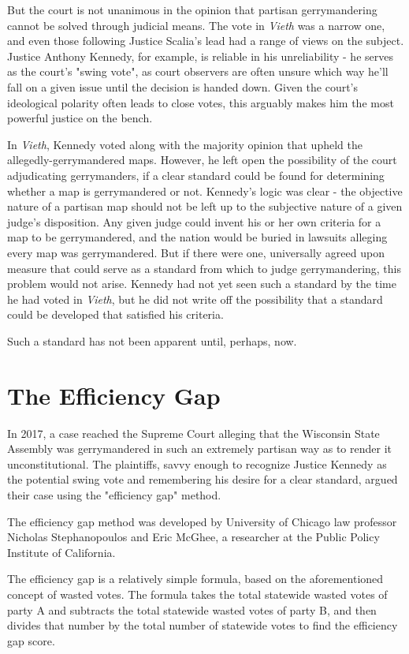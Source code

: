 \documentclass[sigconf]{acmart}
\begin{document}
But the court is not unanimous in the opinion that partisan gerrymandering cannot be solved through judicial means. The vote in \textit{Vieth} was a narrow one, and even those following Justice Scalia's lead had a range of views on the subject. Justice Anthony Kennedy, for example, is reliable in his unreliability - he serves as the court's "swing vote", as court observers are often unsure which way he'll fall on a given issue until the decision is handed down. Given the court's ideological polarity often leads to close votes, this arguably makes him the most powerful justice on the bench. 

In \textit{Vieth}, Kennedy voted along with the majority opinion that upheld the allegedly-gerrymandered maps. However, he left open the possibility of the court adjudicating gerrymanders, if a clear standard could be found for determining whether a map is gerrymandered or not.\cite{wapo} Kennedy's logic was clear - the objective nature of a partisan map should not be left up to the subjective nature of a given judge's disposition. Any given judge could invent his or her own criteria for a map to be gerrymandered, and the nation would be buried in lawsuits alleging every map was gerrymandered. But if there were one, universally agreed upon measure that could serve as a standard from which to judge gerrymandering, this problem would not arise. Kennedy had not yet seen such a standard by the time he had voted in \textit{Vieth}, but he did not write off the possibility that a standard could be developed that satisfied his criteria.

Such a standard has not been apparent until, perhaps, now.

\section{The Efficiency Gap}
In 2017, a case reached the Supreme Court alleging that the Wisconsin State Assembly was gerrymandered in such an extremely partisan way as to render it unconstitutional. The plaintiffs, savvy enough to recognize Justice Kennedy as the potential swing vote and remembering his desire for a clear standard, argued their case using the "efficiency gap" method.\cite{wapo}

The efficiency gap method was developed by University of Chicago law professor Nicholas Stephanopoulos and Eric McGhee, a researcher at the Public Policy Institute of California.\cite{chicago}

The efficiency gap is a relatively simple formula, based on the aforementioned concept of wasted votes. The formula takes the total statewide wasted votes of party A and subtracts the total statewide wasted votes of party B, and then divides that number by the total number of statewide votes to find the efficiency gap score.\cite{chicagoformula}
\end{document}
